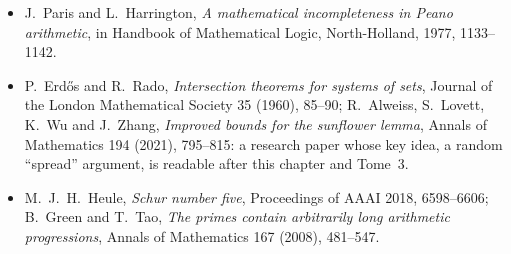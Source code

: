 \begin{itemize}
{Ramsey numbers}, Electronic Journal of Combinatorics, Dynamic Survey DS1 (regularly revised); V.~Angeltveit and B.~D.~McKay, \emph{$R(5,5)\le46$}, preprint, 2024.
\item J.~Paris and L.~Harrington, \emph{A mathematical incompleteness in Peano arithmetic}, in Handbook of Mathematical Logic, North-Holland, 1977, 1133--1142.
\item P.~Erd\H os and R.~Rado, \emph{Intersection theorems for systems of sets}, Journal of the London Mathematical Society 35 (1960), 85--90; R.~Alweiss, S.~Lovett, K.~Wu and
J.~Zhang, \emph{Improved bounds for the sunflower lemma}, Annals of Mathematics 194 (2021), 795--815: a research paper whose key idea, a random ``spread'' argument, is
readable after this chapter and Tome~3.
\item M.~J.~H.~Heule, \emph{Schur number five}, Proceedings of AAAI 2018, 6598--6606; B.~Green and T.~Tao, \emph{The primes contain arbitrarily long arithmetic progressions},
Annals of Mathematics 167 (2008), 481--547.
\end{itemize}
